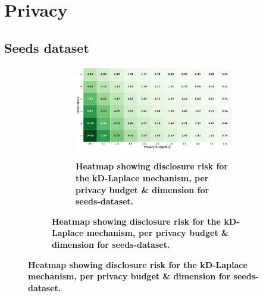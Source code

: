 \section{Privacy} \label{appendix:results-privacy}
\subsection{Seeds dataset} \label{appendix:results-privacy-seeds-dataset}
\begin{figure}[H]
    \centering
    \begin{subfigure}[b]{0.9\textwidth}
        \begin{subfigure}[c]{1\textwidth}
            \caption{\textbf{Heatmap showing disclosure risk for the kD-Laplace mechanism, per privacy budget \& dimension for seeds-dataset.}}
            \includegraphics[width=1\textwidth]{Results/kd-laplace/kd-Laplace/seeds-dataset/distance.png}
            \label{fig:privacy_dist_seeds-dataset_adversial_advantage_kd-laplace}
        \end{subfigure}
        \vfill %


\end{subfigure}
\end{figure}

